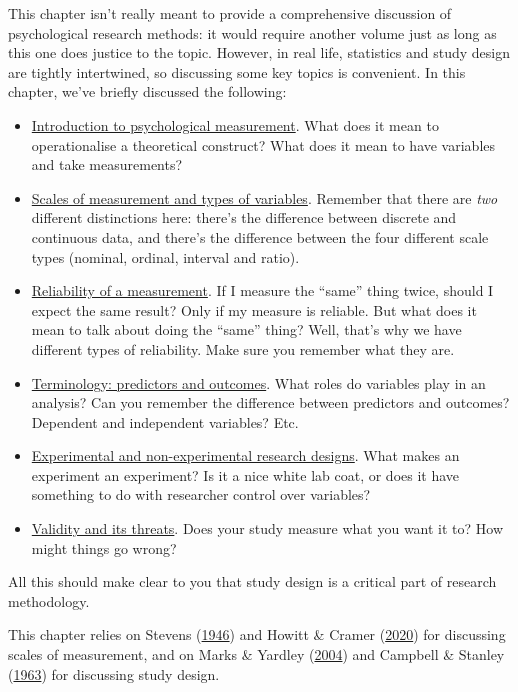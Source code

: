 \documentclass[
  11pt,
]{book}
\providecommand{\tightlist}{%
  \setlength{\itemsep}{0pt}\setlength{\parskip}{0pt}}
\theoremstyle{definition}
\theoremstyle{definition}
\theoremstyle{definition}
\theoremstyle{definition}
\theoremstyle{remark}
\begin{document}
This chapter isn't really meant to provide a comprehensive discussion of psychological research methods: it would require another volume just as long as this one does justice to the topic. However, in real life, statistics and study design are tightly intertwined, so discussing some key topics is convenient. In this chapter, we've briefly discussed the following:

\begin{itemize}
\tightlist
\item
  \protect\hyperlink{measurement}{Introduction to psychological measurement}. What does it mean to operationalise a theoretical construct? What does it mean to have variables and take measurements?
\item
  \protect\hyperlink{scales}{Scales of measurement and types of variables}. Remember that there are \emph{two} different distinctions here: there's the difference between discrete and continuous data, and there's the difference between the four different scale types (nominal, ordinal, interval and ratio).
\item
  \protect\hyperlink{reliability}{Reliability of a measurement}. If I measure the ``same'' thing twice, should I expect the same result? Only if my measure is reliable. But what does it mean to talk about doing the ``same'' thing? Well, that's why we have different types of reliability. Make sure you remember what they are.
\item
  \protect\hyperlink{ivdv}{Terminology: predictors and outcomes}. What roles do variables play in an analysis? Can you remember the difference between predictors and outcomes? Dependent and independent variables? Etc.
\item
  \protect\hyperlink{researchdesigns}{Experimental and non-experimental research designs}. What makes an experiment an experiment? Is it a nice white lab coat, or does it have something to do with researcher control over variables?
\item
  \protect\hyperlink{validity}{Validity and its threats}. Does your study measure what you want it to? How might things go wrong?
\end{itemize}

All this should make clear to you that study design is a critical part of research methodology.

This chapter relies on Stevens (\protect\hyperlink{ref-Stevens1946}{1946}) and Howitt \& Cramer (\protect\hyperlink{ref-howittUnderstandingStatisticsPsychology2020}{2020}) for discussing scales of measurement, and on Marks \& Yardley (\protect\hyperlink{ref-marksResearchMethodsClinical2004}{2004}) and Campbell \& Stanley (\protect\hyperlink{ref-Campbell1963}{1963}) for discussing study design.
\end{document}
